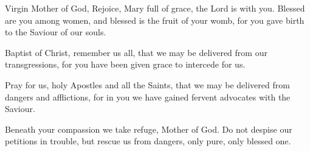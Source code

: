 Virgin Mother of God, Rejoice, Mary full of grace, the Lord is with you. Blessed are you among women, and blessed is the fruit of your womb, for you gave birth to the Saviour of our souls.

Baptist of Christ, remember us all, that we may be delivered from our transgressions, for you have been given grace to intercede for us.


Pray for us, holy Apostles and all the Saints, that we may be delivered from dangers and afflictions, for in you we have gained fervent advocates with the Saviour.


Beneath your compassion we take refuge, Mother of God. Do not despise our petitions in trouble, but rescue us from dangers, only pure, only blessed one.


\joannicius


\allmyhope


\throughtheprayers
